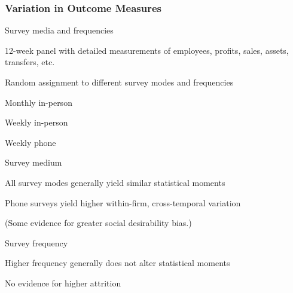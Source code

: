 \documentclass[hideothersubsections, usenames,dvipsnames,11pt]{beamer}
\newenvironment{itemize_2pt}{\itemize\addtolength{\itemsep}{2pt}}{\enditemize}
\newenvironment{enumerate_2pt}{\enumerate\addtolength{\itemsep}{2pt}}{\endenumerate}
\begin{document}
\begin{frame}
\frametitle{Variation in Outcome Measures}

Survey media and frequencies \citep{Garlick2019}
\begin{itemize_2pt}
	\item 12-week panel with detailed measurements of employees, profits, sales, assets, transfers, etc.
	\item Random assignment to different survey modes and frequencies
	\begin{enumerate_2pt}
		\item Monthly in-person
		\item Weekly in-person
		\item Weekly phone
	\end{enumerate_2pt}
		
	\pause		
	
	\item Survey medium
	\begin{itemize_2pt}
		\item \textcolor{bdf}{All survey modes generally yield similar statistical moments}
		\item Phone surveys yield higher within-firm, cross-temporal variation
		\item[] (Some evidence for greater social desirability bias.)
	\end{itemize_2pt}
	
	\item Survey frequency
	\begin{itemize_2pt}
		\item \textcolor{bdf}{Higher frequency generally does not alter statistical moments}
		\item No evidence for higher attrition
	\end{itemize_2pt}
\end{itemize_2pt}
\end{frame}



\end{document}
